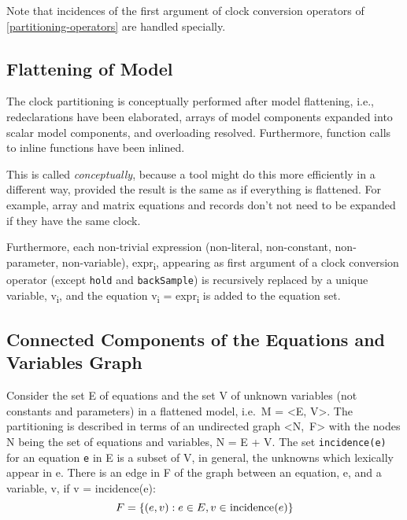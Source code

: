 Note that incidences of the first argument of clock conversion operators
of \cref{partitioning-operators} are handled specially.

\subsection{Flattening of Model}\label{flattening-of-model}

The clock partitioning is conceptually performed after model flattening,
i.e., redeclarations have been elaborated, arrays of model components
expanded into scalar model components, and overloading resolved.
Furthermore, function calls to inline functions have been inlined.

\begin{nonnormative}
This is called \emph{conceptually}, because a tool might do this more efficiently in a different way, provided the result is the same as if everything is flattened.  For example,
array and matrix equations and records don't not need to be expanded if they have the same clock.
\end{nonnormative}

Furthermore, each non-trivial expression (non-literal, non-constant,
non-parameter, non-variable), expr\textsubscript{i}, appearing as first
argument of a clock conversion operator (except \lstinline!hold! and \lstinline!backSample!)
is recursively replaced by a
unique variable, v\textsubscript{i}, and the equation v\textsubscript{i}
= expr\textsubscript{i} is added to the equation set.

\subsection{Connected Components of the Equations and Variables Graph}\label{connected-components-of-the-equations-and-variables-graph}

Consider the set E of equations and the set V of unknown variables (not
constants and parameters) in a flattened model, i.e.\ M = \textless{}E,
V\textgreater{}. The partitioning is described in terms of an undirected
graph \textless{}N,~F\textgreater{} with the nodes N being the set of
equations and variables, N = E + V. The set \lstinline!incidence(e)! for an equation
\lstinline!e! in E is a subset of V, in general, the unknowns which lexically appear
in e. There is an edge in F of the graph between an equation, e, and a
variable, v, if v = incidence(e):
\begin{equation*}
F = \{(e, v) : e \in E, v \in \text{\lstinline!incidence!}(e)\}
\end{equation*}

